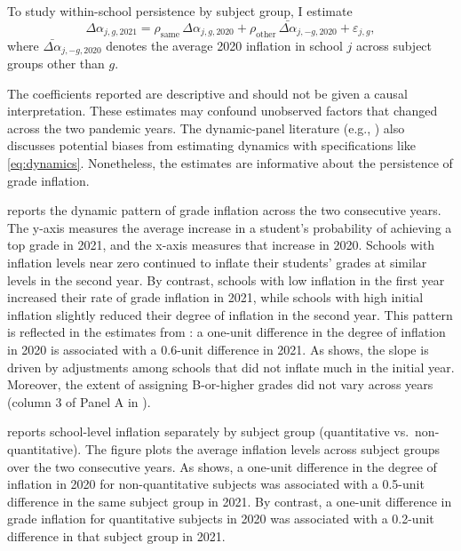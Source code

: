 To study within-school persistence by subject group, I estimate
\begin{equation}\label{eq:dynamics}
\Delta\alpha_{j,g,2021}
= \rho_{\mathrm{same}}\,\Delta\alpha_{j,g,2020}
+ \rho_{\mathrm{other}}\,\bar{\Delta\alpha}_{j,-g,2020}
+ \varepsilon_{j,g},
\end{equation}
where \(\bar{\Delta\alpha}_{j,-g,2020}\) denotes the average 2020 inflation in school \(j\) across subject groups other than \(g\).

The coefficients reported are descriptive and should not be given a causal interpretation. These estimates may confound unobserved factors that changed across the two pandemic years. The dynamic-panel literature (e.g., \cite{bond2002dynamic}) also discusses potential biases from estimating dynamics with specifications like \eqref{eq:dynamics}. Nonetheless, the estimates are informative about the persistence of grade inflation.


 reports the dynamic pattern of grade inflation across the two consecutive years. The y-axis measures the average increase in a student's probability of achieving a top grade in 2021, and the x-axis measures that increase in 2020. Schools with inflation levels near zero continued to inflate their students' grades at similar levels in the second year. By contrast, schools with low inflation in the first year increased their rate of grade inflation in 2021, while schools with high initial inflation slightly reduced their degree of inflation in the second year. This pattern is reflected in the estimates from : a one-unit difference in the degree of inflation in 2020 is associated with a 0.6-unit difference in 2021. As  shows, the slope is driven by adjustments among schools that did not inflate much in the initial year. Moreover, the extent of assigning B-or-higher grades did not vary across years (column 3 of Panel A in ).

 reports school-level inflation separately by subject group (quantitative vs.\ non-quantitative). The figure plots the average inflation levels across subject groups over the two consecutive years. As  shows, a one-unit difference in the degree of inflation in 2020 for non-quantitative subjects was associated with a 0.5-unit difference in the same subject group in 2021. By contrast, a one-unit difference in grade inflation for quantitative subjects in 2020 was associated with a 0.2-unit difference in that subject group in 2021.

